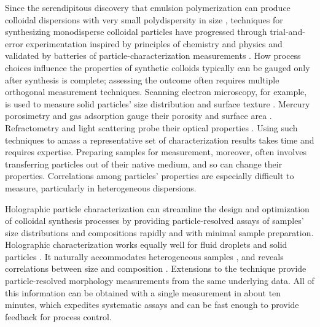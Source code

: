 \documentclass[journal=langd5,manuscript=article]{achemso}
\begin{document}
Since the serendipitous discovery that emulsion polymerization
can produce colloidal dispersions with very small polydispersity
in size
\cite{backus1949small,gerould1950comments},
techniques for synthesizing
monodisperse colloidal particles have progressed
through trial-and-error experimentation
inspired by principles of chemistry and physics 
and validated by batteries of particle-characterization
measurements 
\cite{vanderhoff1956some,stober1968controlled,kotera1970colloid,dezelic1970preparation,goodwin1974studies,antl1986preparation}.
How process choices influence the properties of synthetic colloids
typically can be gauged only after
synthesis is complete;
assessing the outcome often requires
multiple orthogonal measurement techniques.
Scanning electron microscopy, for example, is used to measure
solid particles' size distribution and surface texture \cite{yamada85}.
Mercury porosimetry and gas adsorption gauge their porosity
\cite{giesche2006mercury} and surface area \cite{rouquerol1994}. 
Refractometry and light scattering probe their optical properties
\cite{chou54}.
Using such techniques to amass a representative 
set of characterization results
takes time and requires expertise.
Preparing samples for measurement, moreover, often involves
transferring particles out of their native medium,
and so can change their properties.
Correlations among particles' properties are especially
difficult to measure, particularly in heterogeneous
dispersions.

Holographic particle characterization can streamline
the design and optimization of colloidal synthesis processes
by providing particle-resolved assays of samples' size distributions
and compositions rapidly and with minimal sample preparation.
Holographic characterization works equally
well for fluid droplets and solid particles
\cite{cheong11,philips2017holographic}.
It naturally accommodates heterogeneous
samples \cite{lee07a,yevick2014machine},
and reveals correlations between size and composition
\cite{cheong11,wang2016fractal}.
Extensions to the technique
provide particle-resolved morphology measurements from the same underlying data.
All of this information can be obtained with a
single measurement in about ten minutes, which
expedites systematic assays and can be fast enough to provide feedback
for process control.
\end{document}
